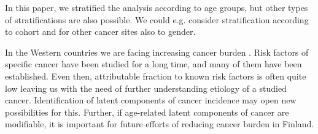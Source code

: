 \documentclass{llncs}
\begin{document}
In this paper, we  stratified the analysis according to age groups, but other types of stratifications are also possible. We could e.g. consider stratification according to cohort and for other cancer sites also to gender.

In the Western countries we are facing increasing cancer burden \cite{parkin2011}. Risk factors of  specific cancer have been studied for a long time, and many of them have been established. Even then, attributable fraction to known risk factors is often quite low leaving us with the need of further understanding etiology of a studied cancer. Identification of latent components of cancer incidence may open new possibilities for this. Further, if age-related latent components of cancer are modifiable, it is important for future efforts of reducing cancer burden in Finland. 







\end{document}
